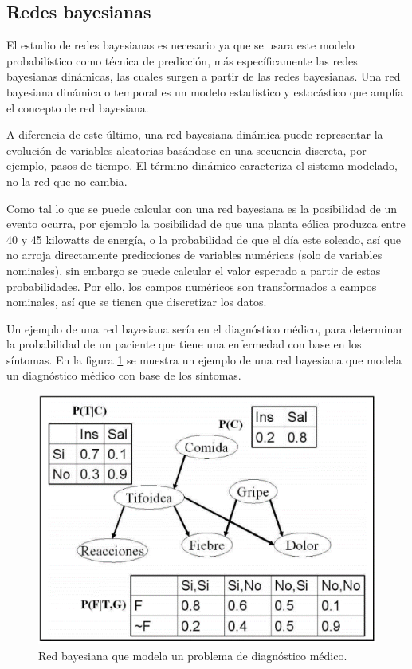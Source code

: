 \subsection{Redes bayesianas} \label{subsec:redesbayesianas}
El estudio de redes bayesianas es necesario ya que se usara este modelo probabilístico como técnica de predicción, más específicamente las redes bayesianas dinámicas, las cuales surgen a partir de las redes bayesianas. Una red bayesiana dinámica o temporal es un modelo estadístico y estocástico que amplía el concepto de red bayesiana.

A diferencia de este último, una red bayesiana dinámica puede representar la evolución de variables aleatorias basándose en una secuencia discreta, por ejemplo, pasos de tiempo. 
El término dinámico caracteriza el sistema modelado, no la red que no cambia.

Como tal lo que se puede calcular con una red bayesiana es la posibilidad de un evento ocurra,
por ejemplo la posibilidad de que una planta eólica produzca entre 40 y 45 kilowatts de energía, o la probabilidad de que el día este soleado, así que no arroja directamente predicciones de variables numéricas (solo de variables nominales), sin embargo se puede calcular el valor esperado a partir de estas probabilidades. Por ello, los campos numéricos son transformados a campos nominales, así que se tienen que discretizar los datos.

Un ejemplo de una red bayesiana sería en el diagnóstico médico, para determinar la probabilidad de un paciente que tiene una enfermedad con base en los síntomas. En la figura \ref{fig:redBayesianaDiagnostico} se muestra un ejemplo de una red bayesiana que modela un diagnóstico médico con base de los síntomas.

\begin{figure}[h]
	\centering
	\includegraphics[width=13cm]{img/redBayesianaDiagnostico.png}
	\caption{Red bayesiana que modela un problema de diagnóstico médico.}
	\label{fig:redBayesianaDiagnostico}
\end{figure}

